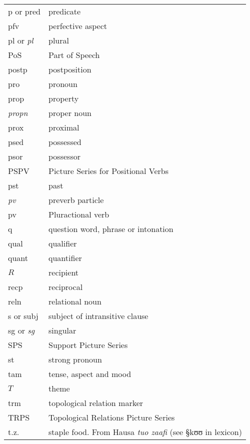 \begin{xtabular}{ll}
{\sc p} or  {\sc pred} & predicate\\
{\sc pfv} & perfective aspect \\%
{\sc pl} or {\it pl} &  plural \\
PoS & Part of Speech\\
 {\sc postp} & postposition \\
{\sc pro} & pronoun \\ %
 {\sc prop} & property  \\ %
 {\it propn} & proper noun  \\ %
 {\sc prox} & proximal \\
{\sc psed} & possessed\\ 
{\sc psor} & possessor\\
PSPV&  Picture Series for Positional Verbs \\
{\sc pst} & past  \\

 {\it pv} & preverb particle \\
 {\sc pv} &Pluractional verb \\



{\sc q} & question word, phrase or intonation\\
{\sc qual} &  qualifier\\
{\sc quant} &  quantifier\\

\thispagestyle{plain}

$R$ & recipient \\ 
 {\sc recp} & reciprocal \\
 {\sc reln} & relational noun \\

{\sc s} or {\sc subj}& subject of intransitive clause\\
{\sc sg} or {\it sg}  & singular \\  
SPS & Support  Picture Series\\
{\sc st} &strong pronoun\\


{\sc tam} & tense, aspect and mood \\
$T$ & theme \\  
{\sc trm} & topological relation marker \\
TRPS& Topological Relations Picture Series\\
t.z. & staple food. From Hausa {\it  tuo zaafi} (see {\S kʊʊ} in lexicon)\\


\end{xtabular}
